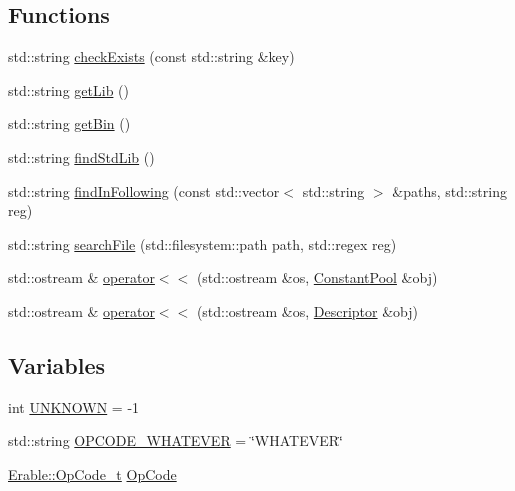 \subsection*{Functions}
\begin{DoxyCompactItemize}
\item 
std\+::string \mbox{\hyperlink{namespace_erable_a9ac51d513b3b6629dcde72f4bf50dce2}{check\+Exists}} (const std\+::string \&key)
\item 
std\+::string \mbox{\hyperlink{namespace_erable_ae9dba4ed847d7fbcf9fc1f437578ef91}{get\+Lib}} ()
\item 
std\+::string \mbox{\hyperlink{namespace_erable_a55a887a018ba68ab971e3711a638dfa1}{get\+Bin}} ()
\item 
std\+::string \mbox{\hyperlink{namespace_erable_a88ace7b6867a84bf35b98b063516dd06}{find\+Std\+Lib}} ()
\item 
std\+::string \mbox{\hyperlink{namespace_erable_afa01b2a2d08571557c8442da41cb72ec}{find\+In\+Following}} (const std\+::vector$<$ std\+::string $>$ \&paths, std\+::string reg)
\item 
std\+::string \mbox{\hyperlink{namespace_erable_ab8dc07f5bbd7c2e716b38c2feaca831b}{search\+File}} (std\+::filesystem\+::path path, std\+::regex reg)
\item 
std\+::ostream \& \mbox{\hyperlink{namespace_erable_a248ccc14098f3d28bd8c59ac41eeee0f}{operator$<$$<$}} (std\+::ostream \&os, \mbox{\hyperlink{class_erable_1_1_constant_pool}{Constant\+Pool}} \&obj)
\item 
std\+::ostream \& \mbox{\hyperlink{namespace_erable_ad7b7bf528e735eaad7f3d472002b1f74}{operator$<$$<$}} (std\+::ostream \&os, \mbox{\hyperlink{class_erable_1_1_descriptor}{Descriptor}} \&obj)
\end{DoxyCompactItemize}
\subsection*{Variables}
\begin{DoxyCompactItemize}
\item 
int \mbox{\hyperlink{namespace_erable_a6d9e1e498f68cd7fa1c71cb362c89333}{U\+N\+K\+N\+O\+WN}} = -\/1
\item 
std\+::string \mbox{\hyperlink{namespace_erable_a60c921f1f338c12555495547451795f3}{O\+P\+C\+O\+D\+E\+\_\+\+W\+H\+A\+T\+E\+V\+ER}} = \char`\"{}W\+H\+A\+T\+E\+V\+ER\char`\"{}
\item 
\mbox{\hyperlink{class_erable_1_1_op_code__t}{Erable\+::\+Op\+Code\+\_\+t}} \mbox{\hyperlink{namespace_erable_adf78214f7408cc5507bb91e4e022379c}{Op\+Code}}
\end{DoxyCompactItemize}


